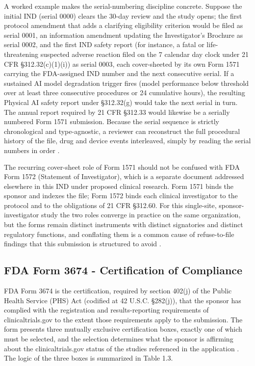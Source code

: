 A worked example makes the serial-numbering discipline concrete. Suppose
the initial IND (serial 0000) clears the 30-day review and the study
opens; the first protocol amendment that adds a clarifying eligibility
criterion would be filed as serial 0001, an information amendment updating
the Investigator's Brochure as serial 0002, and the first IND safety
report (for instance, a fatal or life-threatening suspected adverse
reaction filed on the 7 calendar day clock under 21 CFR \S 312.32(c)(1)(i))
as serial 0003, each cover-sheeted by its own Form 1571 carrying the
FDA-assigned IND number and the next consecutive serial. If a sustained
AI model degradation trigger fires (model performance below threshold over
at least three consecutive procedures or 24 cumulative hours), the
resulting Physical AI safety report under \S 312.32(g) would take the next
serial in turn. The annual report required by 21 CFR \S 312.33 would
likewise be a serially numbered Form 1571 submission. Because the serial
sequence is strictly chronological and type-agnostic, a reviewer can
reconstruct the full procedural history of the file, drug and device
events interleaved, simply by reading the serial numbers in order
\cite{phase1guidance, paisitedocpk}.

The recurring cover-sheet role of Form 1571 should not be confused with
FDA Form 1572 (Statement of Investigator), which is a separate document
addressed elsewhere in this IND under proposed clinical research. Form
1571 binds the sponsor and indexes the file; Form 1572 binds each clinical
investigator to the protocol and to the obligations of 21 CFR \S 312.60.
For this single-site, sponsor-investigator study the two roles converge in
practice on the same organization, but the forms remain distinct
instruments with distinct signatories and distinct regulatory functions,
and conflating them is a common cause of refuse-to-file findings that this
submission is structured to avoid \cite{phase1guidance, paiautospons}.

\subsection{FDA Form 3674 - Certification of Compliance}

FDA Form 3674 is the certification, required by section 402(j) of the
Public Health Service (PHS) Act (codified at 42 U.S.C. \S 282(j)), that
the sponsor has complied with the registration and results-reporting
requirements of clinicaltrials.gov to the extent those requirements apply
to the submission. The form presents three mutually exclusive
certification boxes, exactly one of which must be selected, and the
selection determines what the sponsor is affirming about the
clinicaltrials.gov status of the studies referenced in the application
\cite{phase1guidance}. The logic of the three boxes is summarized in
Table 1.3.

